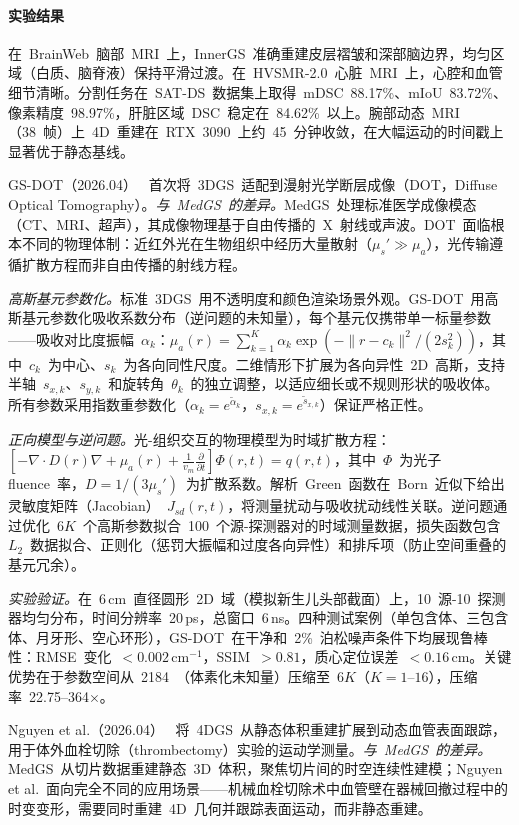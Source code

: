 \paragraph{实验结果}
在~BrainWeb~脑部~MRI~上，InnerGS~准确重建皮层褶皱和深部脑边界，均匀区域（白质、脑脊液）保持平滑过渡。在~HVSMR-2.0~心脏~MRI~上，心腔和血管细节清晰。分割任务在~SAT-DS~数据集上取得~mDSC~88.17\%、mIoU~83.72\%、像素精度~98.97\%，肝脏区域~DSC~稳定在~84.62\%~以上。腕部动态~MRI（38~帧）上~4D~重建在~RTX~3090~上约~45~分钟收敛，在大幅运动的时间戳上显著优于静态基线。

GS-DOT（2026.04）~\cite{2604_23675} 首次将~3DGS~适配到漫射光学断层成像（DOT，Diffuse Optical Tomography）。\textit{与~MedGS~的差异。}MedGS~处理标准医学成像模态（CT、MRI、超声），其成像物理基于自由传播的~X~射线或声波。DOT~面临根本不同的物理体制：近红外光在生物组织中经历大量散射（$\mu_s' \gg \mu_a$），光传输遵循扩散方程而非自由传播的射线方程。

\textit{高斯基元参数化。}标准~3DGS~用不透明度和颜色渲染场景外观。GS-DOT~用高斯基元参数化吸收系数分布（逆问题的未知量），每个基元仅携带单一标量参数——吸收对比度振幅~$\alpha_k$：$\mu_a(r) = \sum_{k=1}^{K} \alpha_k \exp(-\|r - c_k\|^2/(2s_k^2))$，其中~$c_k$~为中心、$s_k$~为各向同性尺度。二维情形下扩展为各向异性~2D~高斯，支持半轴~$s_{x,k}$、$s_{y,k}$~和旋转角~$\theta_k$~的独立调整，以适应细长或不规则形状的吸收体。所有参数采用指数重参数化（$\alpha_k = e^{\tilde{\alpha}_k}$，$s_{x,k} = e^{\tilde{s}_{x,k}}$）保证严格正性。

\textit{正向模型与逆问题。}光-组织交互的物理模型为时域扩散方程：$[-\nabla \cdot D(r)\nabla + \mu_a(r) + \frac{1}{v_m}\frac{\partial}{\partial t}]\Phi(r,t) = q(r,t)$，其中~$\Phi$~为光子 fluence~率，$D = 1/(3\mu_s')$~为扩散系数。解析~Green~函数在~Born~近似下给出灵敏度矩阵（Jacobian）~$J_{sd}(r,t)$，将测量扰动与吸收扰动线性关联。逆问题通过优化~$6K$~个高斯参数拟合~100~个源-探测器对的时域测量数据，损失函数包含~$L_2$~数据拟合、正则化（惩罚大振幅和过度各向异性）和排斥项（防止空间重叠的基元冗余）。

\textit{实验验证。}在~6\,cm~直径圆形~2D~域（模拟新生儿头部截面）上，10~源-10~探测器均匀分布，时间分辨率~20\,ps，总窗口~6\,ns。四种测试案例（单包含体、三包含体、月牙形、空心环形），GS-DOT~在干净和~2\%~泊松噪声条件下均展现鲁棒性：RMSE~变化~$< 0.002$\,cm$^{-1}$，SSIM~$> 0.81$，质心定位误差~$< 0.16$\,cm。关键优势在于参数空间从~2184~（体素化未知量）压缩至~$6K$（$K = 1$--$16$），压缩率~22.75--364$\times$。

Nguyen et al.（2026.04）~\cite{2604_06671} 将~4DGS~从静态体积重建扩展到动态血管表面跟踪，用于体外血栓切除（thrombectomy）实验的运动学测量。\textit{与~MedGS~的差异。}MedGS~从切片数据重建静态~3D~体积，聚焦切片间的时空连续性建模；Nguyen et al.~面向完全不同的应用场景——机械血栓切除术中血管壁在器械回撤过程中的时变变形，需要同时重建~4D~几何并跟踪表面运动，而非静态重建。


